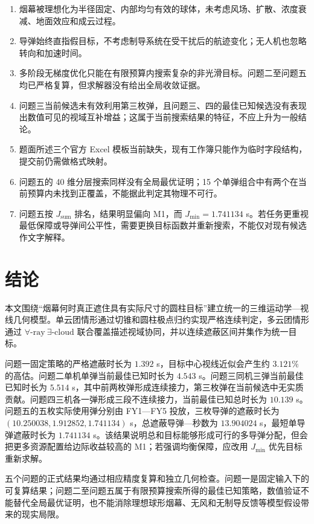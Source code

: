 \begin{enumerate}
\item 烟幕被理想化为半径固定、内部均匀有效的球体，未考虑风场、扩散、浓度衰减、地面效应和成云过程。
\item 导弹始终直指假目标，不考虑制导系统在受干扰后的航迹变化；无人机也忽略转向和加速时间。
\item 多阶段无梯度优化只能在有限预算内搜索复杂的非光滑目标。问题二至问题五均已严格复算，但求解器没有给出全局收敛证据。
\item 问题三当前候选未有效利用第三枚弹，且问题三、四的最佳已知候选没有表现出数值可见的视域互补增益；这属于当前搜索结果的特征，不应上升为一般结论。
\item 题面所述三个官方 Excel 模板当前缺失，现有工作簿只能作为临时字段结构，提交前仍需做格式映射。
\item 问题五的 40 维分层搜索同样没有全局最优证明；15 个单弹组合中有两个在当前预算内未找到正覆盖，不能据此判定其物理不可行。
\item 问题五按 $J_{\mathrm{sum}}$ 排名，结果明显偏向 M1，而 $J_{\min}=1.741134$ s。若任务更重视最低保障或导弹间公平性，需要更换目标函数并重新搜索，不能仅对现有候选作文字解释。
\end{enumerate}

\section{结论}

本文围绕“烟幕何时真正遮住具有实际尺寸的圆柱目标”建立统一的三维运动学—视线几何模型。单云团情形通过切锥和圆柱极点归约实现严格连续判定，多云团情形通过 $\forall\text{-ray}\ \exists\text{-cloud}$ 联合覆盖描述视域协同，并以连续遮蔽区间并集作为统一目标。

问题一固定策略的严格遮蔽时长为 $1.392$ s，目标中心视线近似会产生约 $3.121\%$ 的高估。问题二单机单弹当前最佳已知时长为 $4.543$ s。问题三同机三弹当前最佳已知时长为 $5.514$ s，其中前两枚弹形成连续接力，第三枚弹在当前候选中无实质贡献。问题四三机各一弹形成三段不连续接力，当前最佳已知总时长为 $10.139$ s。问题五的五枚实际使用弹分别由 FY1—FY5 投放，三枚导弹的遮蔽时长为 $(10.250038,\allowbreak{}1.912852,\allowbreak{}1.741134)$ s，总遮蔽导弹—秒数为 $13.904024$ s，最短单导弹遮蔽时长为 $1.741134$ s。该结果说明总和目标能够形成可行的多导弹分配，但会把更多资源配置给边际收益较高的 M1；若强调均衡保障，应改用 $J_{\min}$ 优先目标重新求解。

五个问题的正式结果均通过相应精度复算和独立几何检查。问题一是固定输入下的可复算结果；问题二至问题五属于有限预算搜索所得的最佳已知策略，数值验证不能替代全局最优证明，也不能消除理想球形烟幕、无风和无制导反馈等模型假设带来的现实局限。
